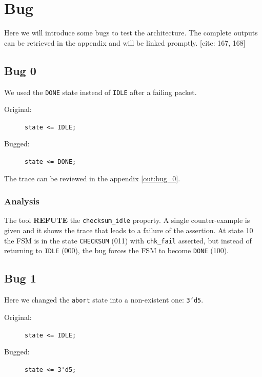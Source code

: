 \chapter{Bug} 
\label{cha:bug}

Here we will introduce some bugs to test the architecture. The complete outputs can be retrieved in the appendix and will be linked promptly. [cite: 167, 168]

\section{Bug 0}
We used the \texttt{DONE} state instead of \texttt{IDLE} after a failing packet.

\begin{description}
    \item[Original:] \lstinline[style=svlog]|state <= IDLE;|
    \item[Bugged:]   \lstinline[style=svlog]|state <= DONE;|
\end{description}

The trace can be reviewed in the appendix \ref{out:bug_0}.

\subsection*{Analysis}
The tool \textbf{REFUTE} the \texttt{checksum\_idle} property.
A single counter-example is given and it shows the trace that leads to a failure of the assertion. 
At state 10 the FSM is in the state \texttt{CHECKSUM} (011) with \texttt{chk\_fail} asserted, but instead of returning to \texttt{IDLE} (000), the bug forces the FSM to become \texttt{DONE} (100).

\section{Bug 1}
Here we changed the \texttt{abort} state into a non-existent one: \texttt{3'd5}.

\begin{description}
    \item[Original:] \lstinline[style=svlog]|state <= IDLE;|
    \item[Bugged:]   \lstinline[style=svlog]|state <= 3'd5;|
\end{description}

